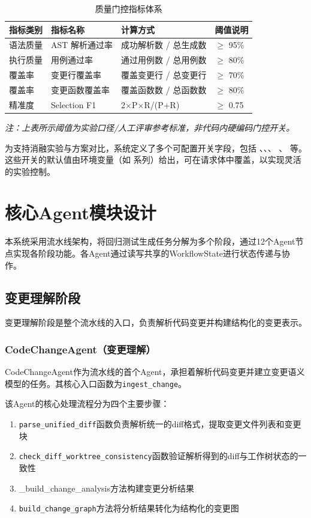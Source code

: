 \begin{table}[htbp]
\centering
\caption{质量门控指标体系}
\label{tab:quality-gates}
\begin{tabular}{llll}
\toprule
指标类别 & 指标名称 & 计算方式 & 阈值说明 \\
\midrule
语法质量 & AST 解析通过率 & 成功解析数 / 总生成数 & $\ge$ 95\% \\
执行质量 & 用例通过率 & 通过用例数 / 总用例数 & $\ge$ 80\% \\
覆盖率 & 变更行覆盖率 & 覆盖变更行 / 总变更行 & $\ge$ 70\% \\
覆盖率 & 变更函数覆盖率 & 覆盖函数数 / 总函数数 & $\ge$ 80\% \\
精准度 & Selection F1 & 2$\times$P$\times$R/(P+R) & $\ge$ 0.75 \\
\bottomrule
\end{tabular}
\end{table}
\textit{注：上表所示阈值为实验口径/人工评审参考标准，非代码内硬编码门控开关。}

为支持消融实验与方案对比，系统定义了多个可配置开关字段，包括
、、、
、 等。
这些开关的默认值由环境变量（如  系列）给出，可在请求体中覆盖，以实现灵活的实验控制。

\section{核心Agent模块设计}
本系统采用流水线架构，将回归测试生成任务分解为多个阶段，通过12个Agent节点实现各阶段功能。各Agent通过读写共享的WorkflowState进行状态传递与协作。
\subsection{变更理解阶段}
变更理解阶段是整个流水线的入口，负责解析代码变更并构建结构化的变更表示。
\subsubsection{CodeChangeAgent（变更理解）}
CodeChangeAgent作为流水线的首个Agent，承担着解析代码变更并建立变更语义模型的任务。其核心入口函数为\texttt{ingest\_change}。

该Agent的核心处理流程分为四个主要步骤：
\begin{enumerate}
    \item \texttt{parse\_unified\_diff}函数负责解析统一的diff格式，提取变更文件列表和变更块
    \item \texttt{check\_diff\_worktree\_consistency}函数验证解析得到的diff与工作树状态的一致性
    \item \_build\_change\_analysis方法构建变更分析结果
    \item \texttt{build\_change\_graph}方法将分析结果转化为结构化的变更图
\end{enumerate}

